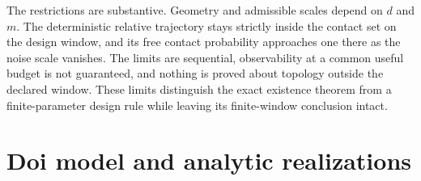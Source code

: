 \documentclass{iopjournal}
\theoremstyle{plain}
\theoremstyle{definition}
\newcommand{\secprefix}{}
\begin{document}
The restrictions are substantive.  Geometry and admissible scales depend on
\(d\) and \(m\).  The deterministic relative trajectory stays strictly
inside the contact set on the design window, and its free contact probability
approaches one there as the noise scale vanishes.  The limits are sequential,
observability at a common useful budget is not guaranteed, and nothing is
proved about topology outside the declared window.  These limits distinguish
the exact existence theorem from a finite-parameter design rule while leaving
its finite-window conclusion intact.




\appendix

\makeatletter\renewcommand{\secprefix}{Appendix~}\makeatother

\section{Doi model and analytic realizations}
\label{app:doi-model}
\end{document}
